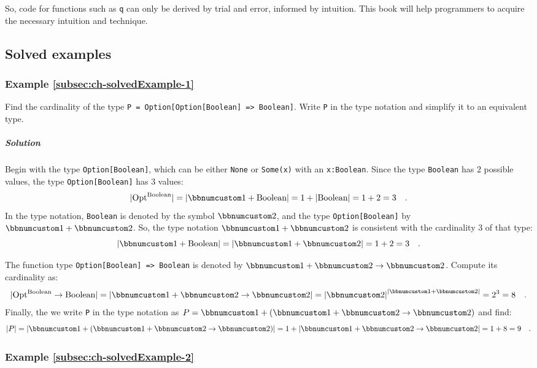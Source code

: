 So, code for functions such as \lstinline!q! can only be derived
by trial and error, informed by intuition. This book will help programmers
to acquire the necessary intuition and technique.

\subsection{Solved examples}

\subsubsection{Example \label{subsec:ch-solvedExample-1}\ref{subsec:ch-solvedExample-1}}

Find the cardinality of the type \lstinline!P = Option[Option[Boolean] => Boolean]!.
Write \lstinline!P! in the type notation and simplify it to an equivalent
type.

\subparagraph{Solution}

Begin with the type \lstinline!Option[Boolean]!, which can be either
\lstinline!None! or \lstinline!Some(x)! with an \lstinline!x:Boolean!.
Since the type \lstinline!Boolean! has $2$ possible values, the
type \lstinline!Option[Boolean]! has $3$ values:
\[
|\text{Opt}^{\text{Boolean}}|=\left|\bbnum 1+\text{Boolean}\right|=1+\left|\text{Boolean}\right|=1+2=3\quad.
\]
In the type notation, \lstinline!Boolean! is denoted by the symbol
$\bbnum 2$, and the type \lstinline!Option[Boolean]! by $\bbnum 1+\bbnum 2$.
So, the type notation $\bbnum 1+\bbnum 2$ is consistent with the
cardinality $3$ of that type:
\[
\left|\bbnum 1+\text{Boolean}\right|=\left|\bbnum 1+\bbnum 2\right|=1+2=3\quad.
\]

The function type \lstinline!Option[Boolean] => Boolean! is denoted
by $\bbnum 1+\bbnum 2\rightarrow\bbnum 2$. Compute its cardinality
as:
\[
|\text{Opt}^{\text{Boolean}}\rightarrow\text{Boolean}|=\left|\bbnum 1+\bbnum 2\rightarrow\bbnum 2\right|=\left|\bbnum 2\right|^{\left|\bbnum 1+\bbnum 2\right|}=2^{3}=8\quad.
\]
Finally, the we write \lstinline!P! in the type notation as $P=\bbnum 1+\left(\bbnum 1+\bbnum 2\rightarrow\bbnum 2\right)$
and find:
\[
\left|P\right|=\left|\bbnum 1+\left(\bbnum 1+\bbnum 2\rightarrow\bbnum 2\right)\right|=1+\left|\bbnum 1+\bbnum 2\rightarrow\bbnum 2\right|=1+8=9\quad.
\]


\subsubsection{Example \label{subsec:ch-solvedExample-2}\ref{subsec:ch-solvedExample-2}}

